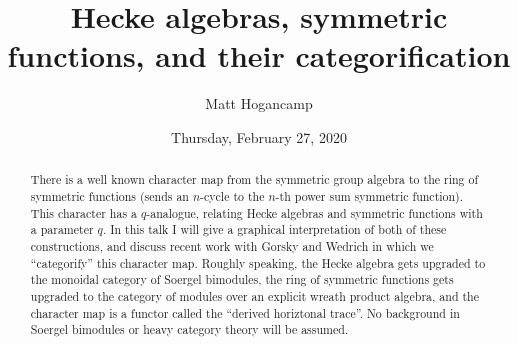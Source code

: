 \documentclass{UAmathtalk}
\author{Matt Hogancamp}
\title{Hecke algebras, symmetric functions, and their categorification}
\date{Thursday, February 27, 2020}
\begin{document}
\maketitle

\begin{abstract}
There is a well known character map from the symmetric group algebra to the ring of symmetric functions (sends an $n$-cycle to the $n$-th power sum symmetric function).  This character has a $q$-analogue, relating Hecke algebras and symmetric functions with a parameter $q$.  In this talk I will give a graphical interpretation of both of these constructions, and discuss recent work with Gorsky and Wedrich in which we ``categorify'' this character map.  Roughly speaking, the Hecke algebra gets upgraded to the monoidal category of Soergel bimodules, the ring of symmetric functions gets upgraded to the category of modules over an explicit wreath product algebra, and the character map is a functor called the ``derived horiztonal trace''.  No background in Soergel bimodules or heavy category theory will be assumed.
\end{abstract}
\end{document}
